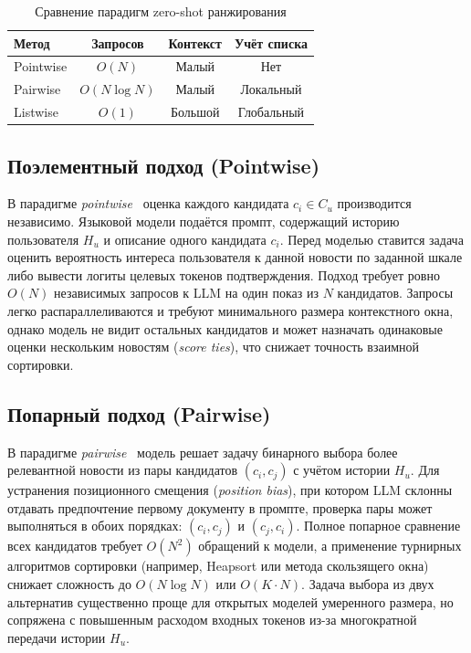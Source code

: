 \documentclass{misisarticle}
\begin{document}
\begin{table}[htbp]
  \caption{Сравнение парадигм zero-shot ранжирования}
  \label{tab:methods}
  \centering
  \begin{tabular}{@{}lccc@{}}
    \toprule
    \textbf{Метод} & \textbf{Запросов} & \textbf{Контекст} & \textbf{Учёт списка} \\
    \midrule
    Pointwise & $O(N)$ & Малый & Нет \\
    Pairwise  & $O(N \log N)$ & Малый & Локальный \\
    Listwise  & $O(1)$ & Большой & Глобальный \\
    \bottomrule
  \end{tabular}
\end{table}

\subsection{Поэлементный подход (Pointwise)}

В парадигме \textit{pointwise}~\cite{zhang2025recommendation} оценка каждого кандидата $c_i \in C_u$ производится независимо. Языковой модели подаётся промпт, содержащий историю пользователя $H_u$ и описание одного кандидата $c_i$. Перед моделью ставится задача оценить вероятность интереса пользователя к данной новости по заданной шкале либо вывести логиты целевых токенов подтверждения. Подход требует ровно $O(N)$ независимых запросов к LLM на один показ из $N$ кандидатов. Запросы легко распараллеливаются и требуют минимального размера контекстного окна, однако модель не видит остальных кандидатов и может назначать одинаковые оценки нескольким новостям (\textit{score ties}), что снижает точность взаимной сортировки.

\subsection{Попарный подход (Pairwise)}

В парадигме \textit{pairwise}~\cite{qin2024pairwise} модель решает задачу бинарного выбора более релевантной новости из пары кандидатов $(c_i, c_j)$ с учётом истории $H_u$. Для устранения позиционного смещения (\textit{position bias}), при котором LLM склонны отдавать предпочтение первому документу в промпте, проверка пары может выполняться в обоих порядках: $(c_i, c_j)$ и $(c_j, c_i)$. Полное попарное сравнение всех кандидатов требует $O(N^2)$ обращений к модели, а применение турнирных алгоритмов сортировки (например, Heapsort или метода скользящего окна) снижает сложность до $O(N \log N)$ или $O(K \cdot N)$. Задача выбора из двух альтернатив существенно проще для открытых моделей умеренного размера, но сопряжена с повышенным расходом входных токенов из-за многократной передачи истории $H_u$.
\end{document}
